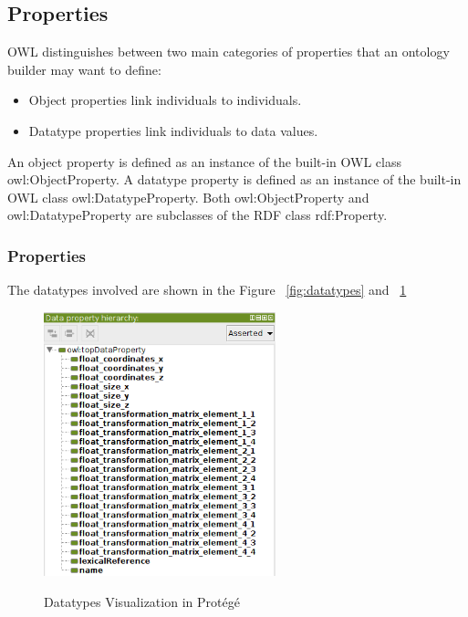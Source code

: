 \subsection*{Properties}
OWL distinguishes between two main categories of properties that an ontology builder may want to define:

\begin{itemize}
	\item Object properties link individuals to individuals.
	\item Datatype properties link individuals to data values.
\end{itemize}

An object property is defined as an instance of the built-in OWL class owl:ObjectProperty. A datatype property is defined as an instance of the built-in OWL class owl:DatatypeProperty. Both owl:ObjectProperty and owl:DatatypeProperty are subclasses of the RDF class rdf:Property.\\

\subsubsection*{Properties}
The datatypes involved are shown in the Figure ~\ref{fig:datatypes} and ~\ref{fig:datatypesProtege}

\begin{figure}[H]
\centering
\includegraphics[width=0.6\textwidth]{imgs/datatypeProtege.png}
\label{fig:datatypesProtege}
\caption{Datatypes Visualization in Prot\'eg\'e}
\end{figure}

